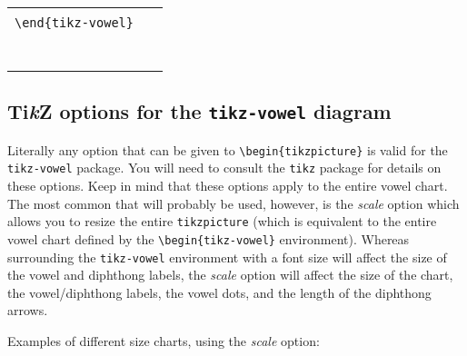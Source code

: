 \documentclass{article}
\newcommand{\TikZ}{Ti\textit{k}Z\xspace}
\newcommand{\pkg}[1]{\texttt{#1}}
\begin{document}
\begin{center}
\begin{tabular}{ll}
  \begin{minipage}[t]{6.5cm}{\small
    \verb|\begin{tikz-vowel}[triangle,three]|\\
    \verb|\end{tikz-vowel}|\\}
  \end{minipage} & 
  \begin{minipage}[t]{6.5cm}
  {~}
  \end{minipage} \\
  \begin{minipage}[t]{6.5cm}{
  \begin{tikz-vowel}\end{tikz-vowel} \\}\end{minipage} &
\end{tabular}
\end{center}

\subsection{\TikZ options for the \pkg{tikz-vowel} diagram}
\label{sec:TikZ options for the tikz-vowel diagram}

Literally any option that can be given to \verb|\begin{tikzpicture}| is valid for the \pkg{tikz-vowel} package.  You will need to consult the \pkg{tikz} package for details on these options.  Keep in mind that these options apply to the entire vowel chart.  The most common that will probably be used, however, is the \textit{scale} option which allows you to resize the entire \texttt{tikzpicture} (which is equivalent to the entire vowel chart defined by the \verb+\begin{tikz-vowel}+ environment).  Whereas surrounding the \texttt{tikz-vowel} environment with a font size will affect the size of the vowel and diphthong labels, the \textit{scale} option will affect the size of the chart, the vowel/diphthong labels, the vowel dots, and the length of the diphthong arrows.

\bigskip
\noindent
Examples of different size charts, using the \textit{scale} option:
\end{document}
